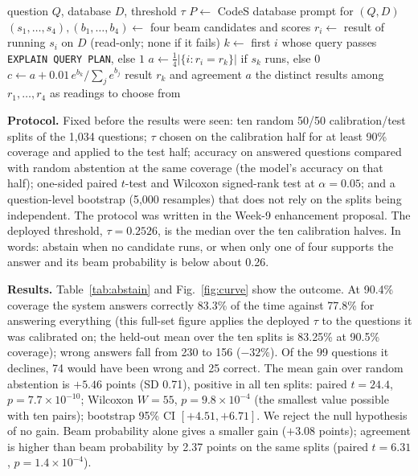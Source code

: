 \documentclass[conference]{IEEEtran}
\begin{document}
\begin{algorithm}[t]
\caption{Answer or ask, for one question}
\label{alg:abstain}
\begin{algorithmic}[1]
\small
\REQUIRE question $Q$, database $D$, threshold $\tau$
\STATE $P \leftarrow$ CodeS database prompt for $(Q,D)$
\STATE $(s_1,\dots,s_4),(b_1,\dots,b_4) \leftarrow$ four beam candidates and scores
  \STATE $r_i \leftarrow$ result of running $s_i$ on $D$ (read-only; none if it fails)
\ENDFOR
\STATE $k \leftarrow$ first $i$ whose query passes \texttt{EXPLAIN QUERY PLAN}, else $1$
\STATE $a \leftarrow \tfrac14\lvert\{i: r_i = r_k\}\rvert$ if $s_k$ runs, else $0$
\STATE $c \leftarrow a + 0.01\,e^{b_k}/\sum_j e^{b_j}$
  \RETURN result $r_k$ and agreement $a$
\ELSE
  \RETURN the distinct results among $r_1,\dots,r_4$ as readings to choose from
\ENDIF
\end{algorithmic}
\end{algorithm}

\textbf{Protocol.} Fixed before the results were seen: ten random 50/50 calibration/test splits of the 1,034 questions; $\tau$ chosen on the calibration half for at least 90\% coverage and applied to the test half; accuracy on answered questions compared with random abstention at the same coverage (the model's accuracy on that half); one-sided paired $t$-test and Wilcoxon signed-rank test at $\alpha=0.05$; and a question-level bootstrap (5,000 resamples) that does not rely on the splits being independent. The protocol was written in the Week-9 enhancement proposal. The deployed threshold, $\tau=0.2526$, is the median over the ten calibration halves. In words: abstain when no candidate runs, or when only one of four supports the answer and its beam probability is below about 0.26.

\textbf{Results.} Table~\ref{tab:abstain} and Fig.~\ref{fig:curve} show the outcome. At 90.4\% coverage the system answers correctly 83.3\% of the time against 77.8\% for answering everything (this full-set figure applies the deployed $\tau$ to the questions it was calibrated on; the held-out mean over the ten splits is 83.25\% at 90.5\% coverage); wrong answers fall from 230 to 156 ($-32\%$). Of the 99 questions it declines, 74 would have been wrong and 25 correct. The mean gain over random abstention is $+5.46$ points (SD 0.71), positive in all ten splits: paired $t=24.4$, $p=7.7\times10^{-10}$; Wilcoxon $W=55$, $p=9.8\times10^{-4}$ (the smallest value possible with ten pairs); bootstrap 95\% CI $[+4.51,+6.71]$. We reject the null hypothesis of no gain. Beam probability alone gives a smaller gain ($+3.08$ points); agreement is higher than beam probability by 2.37 points on the same splits (paired $t=6.31$, $p=1.4\times10^{-4}$).
\end{document}

